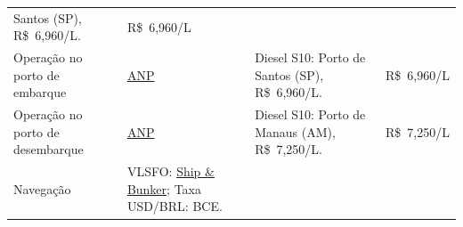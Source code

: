\documentclass[brazil,]{article}
\begin{document}
\begin{longtable}[]{@{}llll@{}}
\begin{minipage}[t]{0.22\columnwidth}
Santos (SP), R\$~6,960/L.\strut
\end{minipage} & \begin{minipage}[t]{0.22\columnwidth}\raggedright
R\$~6,960/L\strut
\end{minipage}\tabularnewline
\begin{minipage}[t]{0.22\columnwidth}\raggedright
Operação no porto de embarque\strut
\end{minipage} & \begin{minipage}[t]{0.22\columnwidth}\raggedright
\href{https://www.gov.br/anp/pt-br/assuntos/precos-e-defesa-da-concorrencia/precos/levantamento-de-precos-de-combustiveis-ultimas-semanas-pesquisadas}{ANP}\strut
\end{minipage} & \begin{minipage}[t]{0.22\columnwidth}\raggedright
Diesel S10: \newline{} Porto de Santos (SP), R\$~6,960/L.\strut
\end{minipage} & \begin{minipage}[t]{0.22\columnwidth}\raggedright
R\$~6,960/L\strut
\end{minipage}\tabularnewline
\begin{minipage}[t]{0.22\columnwidth}\raggedright
Operação no porto de desembarque\strut
\end{minipage} & \begin{minipage}[t]{0.22\columnwidth}\raggedright
\href{https://www.gov.br/anp/pt-br/assuntos/precos-e-defesa-da-concorrencia/precos/levantamento-de-precos-de-combustiveis-ultimas-semanas-pesquisadas}{ANP}\strut
\end{minipage} & \begin{minipage}[t]{0.22\columnwidth}\raggedright
Diesel S10: \newline{} Porto de Manaus (AM), R\$~7,250/L.\strut
\end{minipage} & \begin{minipage}[t]{0.22\columnwidth}\raggedright
R\$~7,250/L\strut
\end{minipage}\tabularnewline
\begin{minipage}[t]{0.22\columnwidth}\raggedright
Navegação\strut
\end{minipage} & \begin{minipage}[t]{0.22\columnwidth}\raggedright
VLSFO: \href{https://shipandbunker.com/prices/br-brazil}{Ship \&
Bunker}; \newline{} Taxa USD/BRL: BCE.\strut
\end{minipage} & \begin{minipage}[t]{0.22\columnwidth}\raggedright

\end{minipage}
\end{longtable}
\end{document}

